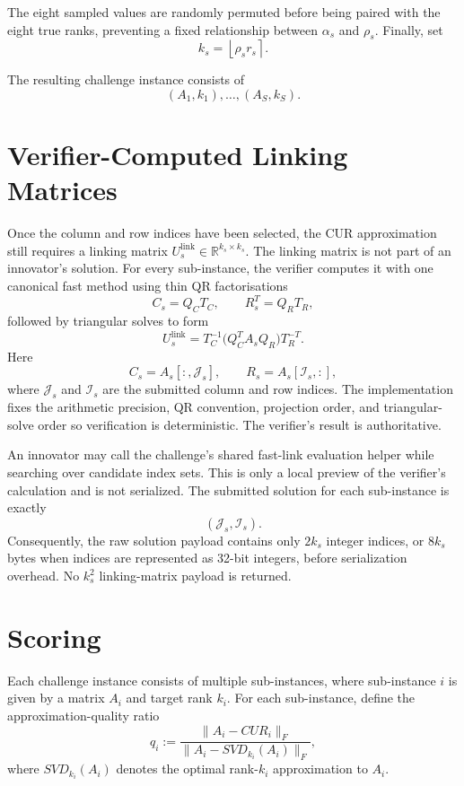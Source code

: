 \documentclass[12pt, legalpaper]{article}
\begin{document}
The eight sampled values are randomly permuted before being paired with the
eight true ranks, preventing a fixed relationship between $\alpha_s$ and
$\rho_s$. Finally, set
\[
k_s=\left\lfloor\rho_s r_s\right\rceil.
\]

The resulting challenge instance consists of
\[
(A_1,k_1),\ldots,(A_S,k_S).
\]


\section{Verifier-Computed Linking Matrices}\label{sec:linking-matrices}

Once the column and row indices have been selected, the CUR approximation
still requires a linking matrix $U_s^{\mathrm{link}}\in
\mathbb{R}^{k_s\times k_s}$. The linking matrix is not part of an innovator's
solution. For every sub-instance, the verifier computes it with one canonical
fast method using thin QR factorisations
\[
C_s=Q_C T_C,
\qquad
R_s^T=Q_R T_R,
\]
followed by triangular solves to form
\[
U_s^{\mathrm{link}}
=
T_C^{-1}\bigl(Q_C^T A_s Q_R\bigr)T_R^{-T}.
\]
Here
\[
C_s=A_s[:,\mathcal J_s],
\qquad
R_s=A_s[\mathcal I_s,:],
\]
where $\mathcal J_s$ and $\mathcal I_s$ are the submitted column and row
indices. The implementation fixes the arithmetic precision, QR convention,
projection order, and triangular-solve order so verification is deterministic.
The verifier's result is authoritative.

An innovator may call the challenge's shared fast-link evaluation helper while
searching over candidate index sets. This is only a local preview of the
verifier's calculation and is not serialized. The submitted solution for each
sub-instance is exactly
\[
(\mathcal J_s,\mathcal I_s).
\]
Consequently, the raw solution payload contains only $2k_s$ integer indices,
or $8k_s$ bytes when indices are represented as 32-bit integers, before
serialization overhead. No $k_s^2$ linking-matrix payload is returned.





\section{Scoring}\label{sec: score}

Each challenge instance consists of multiple sub-instances, where sub-instance $i$
is given by a matrix $A_i$ and target rank $k_i$. For each sub-instance, define
the approximation-quality ratio
\begin{equation}\label{eq err}
q_i
:=
\frac{\|A_i-CUR_i\|_F}
     {\|A_i-SVD_{k_i}(A_i)\|_F},
\end{equation}
where $SVD_{k_i}(A_i)$ denotes the optimal rank-$k_i$ approximation to $A_i$.
\end{document}
